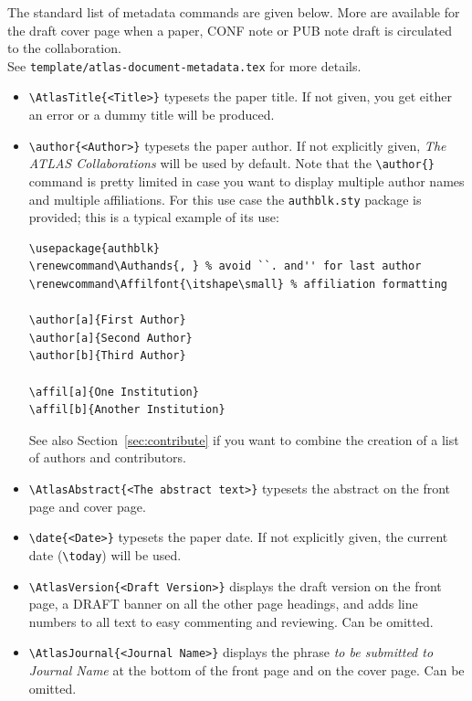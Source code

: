 \documentclass[atlasstyle,UKenglish]{latex/atlasdoc}
\begin{document}
The standard list of metadata commands are given below.
More are available for the draft cover page when a paper, CONF note or PUB note draft
is circulated to the collaboration.\\
See \texttt{template/atlas-document-metadata.tex} for more details.

\begin{itemize}
  \item {\verb|\AtlasTitle{<Title>}|} typesets the paper title. If not
    given, you get either an error or a dummy title will be produced.

  \item {\verb|\author{<Author>}|} typesets the paper author. If not
    explicitly given, \emph{The ATLAS Collaborations} will be used by
    default. Note that the \verb|\author{}| command is pretty limited
    in case you want to display multiple author names and multiple
    affiliations. For this use case the \verb|authblk.sty| package is
    provided; this is a typical example of its use:
    \begin{verbatim}
\usepackage{authblk}
\renewcommand\Authands{, } % avoid ``. and'' for last author
\renewcommand\Affilfont{\itshape\small} % affiliation formatting

\author[a]{First Author}
\author[a]{Second Author}
\author[b]{Third Author}

\affil[a]{One Institution}
\affil[b]{Another Institution}
    \end{verbatim}
    See also Section~\ref{sec:contribute} if you want to combine the creation of a list of authors and contributors.

  \item {\verb|\AtlasAbstract{<The abstract text>}|} typesets the
    abstract on the front page and cover page.

  \item {\verb|\date{<Date>}|} typesets the paper date. If not
    explicitly given, the current date (\verb|\today|) will be used.

  \item {\verb|\AtlasVersion{<Draft Version>}|} displays the draft
    version on the front page, a DRAFT banner on all the other page
    headings, and adds line numbers to all text to easy commenting and
    reviewing. Can be omitted.

  \item {\verb|\AtlasJournal{<Journal Name>}|} displays the phrase \emph{to
    be submitted to Journal Name} at the bottom of the front page and
    on the cover page. Can be omitted.


\end{itemize}
\end{document}

